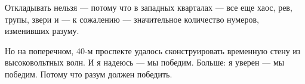 \documentclass[11pt,openany]{book}
\begin{document}
Откладывать нельзя --- потому что в западных кварталах --- все еще хаос, рев, трупы, звери и --- к сожалению --- значительное количество нумеров, изменивших разуму.

Но на поперечном, 40-м проспекте удалось сконструировать временную стену из высоковольтных волн. И я надеюсь --- мы победим. Больше: я уверен --- мы победим. Потому что разум должен победить.
\end{document}
